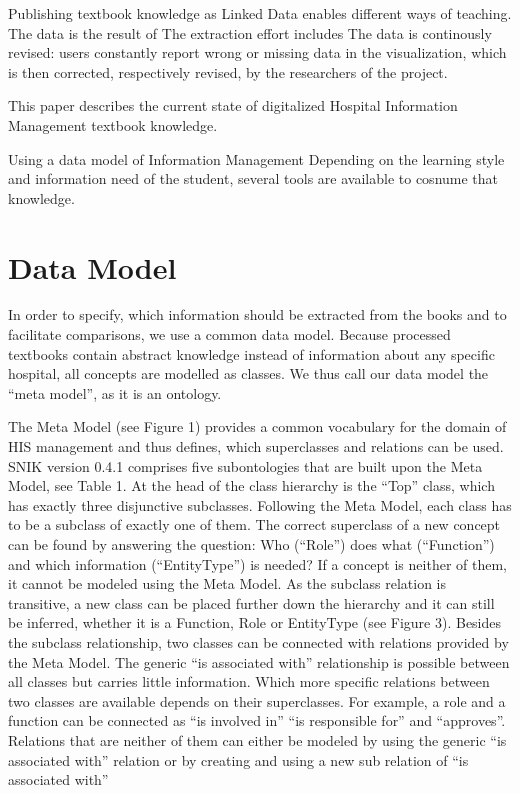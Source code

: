 \documentclass[sw]{iosart2x}
\begin{document}
Publishing textbook knowledge as Linked Data enables different ways of teaching.
The data is the result of 
The extraction effort includes 
The data is continously revised: users constantly report wrong or missing data in the visualization, which is then corrected, respectively revised, by the researchers of the project.

This paper describes the current state of digitalized Hospital Information Management textbook knowledge.

Using a data model of Information Management 
Depending on the learning style and information need of the student, several tools are available to cosnume that knowledge.

\section{Data Model}
In order to specify, which information should be extracted from the books and to facilitate comparisons, we use a common data model.
Because processed textbooks contain abstract knowledge instead of information about any specific hospital, all concepts are modelled as classes.
We thus call our data model the \enquote{meta model}, as it is an ontology.

The Meta Model (see Figure 1) provides a common vocabulary for the domain of HIS management and thus defines, which superclasses and relations can be used.
SNIK version 0.4.1 comprises five subontologies that are built upon the Meta Model, see Table 1.
At the head of the class hierarchy is the “Top” class, which has exactly three disjunctive subclasses.
Following the Meta Model, each class has to be a subclass of exactly one of them.
The correct superclass of a new concept can be found by answering the question: Who (“Role”) does what (“Function”) and which information (“EntityType”) is needed? If a concept is neither of them, it cannot be modeled using the Meta Model.
As the subclass relation is transitive, a new class can be placed further down the hierarchy and it can still be inferred, whether it is a Function, Role or EntityType (see Figure 3).
Besides the subclass relationship, two classes can be connected with relations provided by the Meta Model.
The generic “is associated with” relationship is possible between all classes but carries little information.
Which more specific relations between two classes are available depends on their superclasses.
For example, a role and a function can be connected as “is involved in” “is responsible for” and “approves”.
Relations that are neither of them can either be modeled by using the generic “is associated with” relation or by creating and using a new sub relation of “is associated with”
\end{document}
